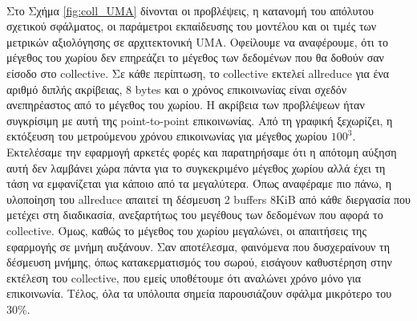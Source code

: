 \paragraph{}
Στο Σχήμα \ref{fig:coll_UMA} δίνονται οι προβλέψεις, η κατανομή του απόλυτου σχετικού σφάλματος, οι παράμετροι εκπαίδευσης του μοντέλου και οι τιμές των μετρικών αξιολόγησης σε αρχιτεκτονική UMA. Οφείλουμε να αναφέρουμε, ότι το μέγεθος του χωρίου δεν επηρεάζει το μέγεθος των δεδομένων που θα δοθούν σαν είσοδο στο collective. Σε κάθε περίπτωση, το collective εκτελεί allreduce για ένα αριθμό διπλής ακρίβειας, 8 bytes και ο χρόνος επικοινωνίας είναι σχεδόν ανεπηρέαστος από το μέγεθος του χωρίου. Η ακρίβεια των προβλέψεων ήταν συγκρίσιμη με αυτή της point-to-point επικοινωνίας. Από τη γραφική ξεχωρίζει, η εκτόξευση του μετρούμενου χρόνου επικοινωνίας για μέγεθος χωρίου $100^3$. Εκτελέσαμε την εφαρμογή αρκετές φορές και παρατηρήσαμε ότι η απότομη αύξηση αυτή δεν λαμβάνει χώρα πάντα για το συγκεκριμένο μέγεθος χωρίου αλλά έχει τη τάση να εμφανίζεται για κάποιο από τα μεγαλύτερα. Όπως αναφέραμε πιο πάνω, η υλοποίηση του allreduce απαιτεί τη δέσμευση 2 buffers 8KiB από κάθε διεργασία που μετέχει στη διαδικασία, ανεξαρτήτως του μεγέθους των δεδομένων που αφορά το collective. Όμως, καθώς το μέγεθος του χωρίου μεγαλώνει, οι απαιτήσεις της εφαρμογής σε μνήμη αυξάνουν. Σαν αποτέλεσμα, φαινόμενα που δυσχεραίνουν τη δέσμευση μνήμης, όπως κατακερματισμός του σωρού, εισάγουν καθυστέρηση στην εκτέλεση του collective, που εμείς υποθέτουμε ότι αναλώνει χρόνο μόνο για επικοινωνία. Τέλος, όλα τα υπόλοιπα σημεία παρουσιάζουν σφάλμα μικρότερο του 30\%.
